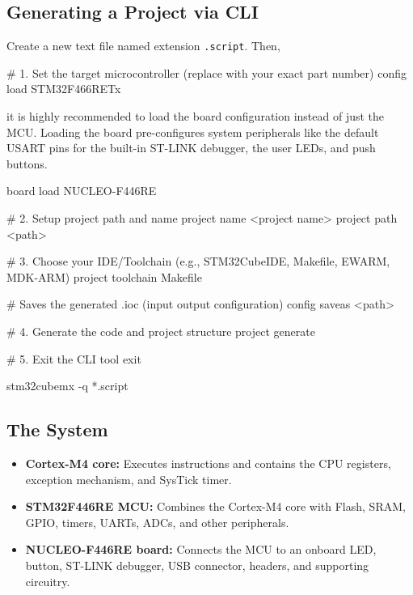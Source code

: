 \documentclass{report}
\begin{document}
    \bigbreak \noindent 
    \subsection{Generating a Project via CLI}
    \bigbreak \noindent 
    Create a new text file named extension \texttt{.script}. Then,
    \bigbreak \noindent 
    \begin{bashcode}
        # 1. Set the target microcontroller (replace with your exact part number)
        config load STM32F466RETx
    \end{bashcode}
    \bigbreak \noindent 
    it is highly recommended to load the board configuration instead of just the MCU. Loading the board pre-configures system peripherals like the default USART pins for the built-in ST-LINK debugger, the user LEDs, and push buttons.
    \bigbreak \noindent 
    \begin{bashcode}
    board load NUCLEO-F446RE

    # 2. Setup project path and name
    project name <project name>
    project path <path>

    # 3. Choose your IDE/Toolchain (e.g., STM32CubeIDE, Makefile, EWARM, MDK-ARM)
    project toolchain Makefile

    # Saves the generated .ioc (input output configuration)
    config saveas <path>

    # 4. Generate the code and project structure
    project generate

    # 5. Exit the CLI tool
    exit
    \end{bashcode}
    \bigbreak \noindent 
    \begin{bashcode}
    stm32cubemx -q *.script
    \end{bashcode}

    \bigbreak \noindent 
    \subsection{The System}
    \begin{itemize}
        \item \textbf{Cortex-M4 core:} Executes instructions and contains the CPU registers, exception mechanism, and SysTick timer.
        \item \textbf{STM32F446RE MCU:} Combines the Cortex-M4 core with Flash, SRAM, GPIO, timers, UARTs, ADCs, and other peripherals.
        \item \textbf{NUCLEO-F446RE board:} Connects the MCU to an onboard LED, button, ST-LINK debugger, USB connector, headers, and supporting circuitry.
    \end{itemize}
\end{document}
